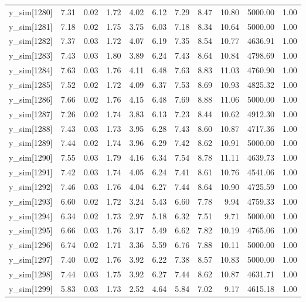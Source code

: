 \begin{table}[ht]
\begin{tabular}{rrrrrrrrrrr}
  y\_sim[1280] & 7.31 & 0.02 & 1.72 & 4.02 & 6.12 & 7.29 & 8.47 & 10.80 & 5000.00 & 1.00 \\ 
  y\_sim[1281] & 7.18 & 0.02 & 1.75 & 3.75 & 6.03 & 7.18 & 8.34 & 10.64 & 5000.00 & 1.00 \\ 
  y\_sim[1282] & 7.37 & 0.03 & 1.72 & 4.07 & 6.19 & 7.35 & 8.54 & 10.77 & 4636.91 & 1.00 \\ 
  y\_sim[1283] & 7.43 & 0.03 & 1.80 & 3.89 & 6.24 & 7.43 & 8.64 & 10.84 & 4798.69 & 1.00 \\ 
  y\_sim[1284] & 7.63 & 0.03 & 1.76 & 4.11 & 6.48 & 7.63 & 8.83 & 11.03 & 4760.90 & 1.00 \\ 
  y\_sim[1285] & 7.52 & 0.02 & 1.72 & 4.09 & 6.37 & 7.53 & 8.69 & 10.93 & 4825.32 & 1.00 \\ 
  y\_sim[1286] & 7.66 & 0.02 & 1.76 & 4.15 & 6.48 & 7.69 & 8.88 & 11.06 & 5000.00 & 1.00 \\ 
  y\_sim[1287] & 7.26 & 0.02 & 1.74 & 3.83 & 6.13 & 7.23 & 8.44 & 10.62 & 4912.30 & 1.00 \\ 
  y\_sim[1288] & 7.43 & 0.03 & 1.73 & 3.95 & 6.28 & 7.43 & 8.60 & 10.87 & 4717.36 & 1.00 \\ 
  y\_sim[1289] & 7.44 & 0.02 & 1.74 & 3.96 & 6.29 & 7.42 & 8.62 & 10.91 & 5000.00 & 1.00 \\ 
  y\_sim[1290] & 7.55 & 0.03 & 1.79 & 4.16 & 6.34 & 7.54 & 8.78 & 11.11 & 4639.73 & 1.00 \\ 
  y\_sim[1291] & 7.42 & 0.03 & 1.74 & 4.05 & 6.24 & 7.41 & 8.61 & 10.76 & 4541.06 & 1.00 \\ 
  y\_sim[1292] & 7.46 & 0.03 & 1.76 & 4.04 & 6.27 & 7.44 & 8.64 & 10.90 & 4725.59 & 1.00 \\ 
  y\_sim[1293] & 6.60 & 0.02 & 1.72 & 3.24 & 5.43 & 6.60 & 7.78 & 9.94 & 4759.33 & 1.00 \\ 
  y\_sim[1294] & 6.34 & 0.02 & 1.73 & 2.97 & 5.18 & 6.32 & 7.51 & 9.71 & 5000.00 & 1.00 \\ 
  y\_sim[1295] & 6.66 & 0.03 & 1.76 & 3.17 & 5.49 & 6.62 & 7.82 & 10.19 & 4765.06 & 1.00 \\ 
  y\_sim[1296] & 6.74 & 0.02 & 1.71 & 3.36 & 5.59 & 6.76 & 7.88 & 10.11 & 5000.00 & 1.00 \\ 
  y\_sim[1297] & 7.40 & 0.02 & 1.76 & 3.92 & 6.22 & 7.38 & 8.57 & 10.83 & 5000.00 & 1.00 \\ 
  y\_sim[1298] & 7.44 & 0.03 & 1.75 & 3.92 & 6.27 & 7.44 & 8.62 & 10.87 & 4631.71 & 1.00 \\ 
  y\_sim[1299] & 5.83 & 0.03 & 1.73 & 2.52 & 4.64 & 5.84 & 7.02 & 9.17 & 4615.18 & 1.00 \\ 

\end{tabular}
\end{table}
